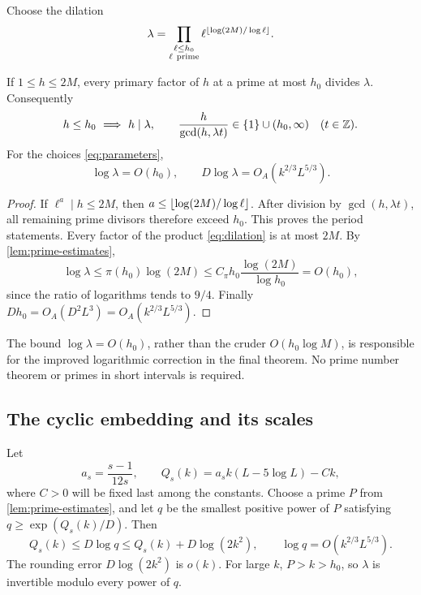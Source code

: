Choose the dilation
\begin{equation}\label{eq:dilation}
 \lambda=
 \prod_{\substack{\ell\le h_0\\\ell\ {\rm prime}}}
 \ell^{\left\lfloor \log(2M)/\log\ell\right\rfloor} .
\end{equation}

\begin{lemma}\label{lem:dilation}
If \(1\le h\le2M\), every primary factor of \(h\) at a prime at most
\(h_0\) divides \(\lambda\). Consequently
\[
 h\le h_0\ \Longrightarrow\ h\mid\lambda,\qquad
 \frac{h}{\gcd(h,\lambda t)}\in\{1\}\cup(h_0,\infty)
 \quad(t\in\Z).
\]
For the choices \eqref{eq:parameters},
\begin{equation}\label{eq:dilation-cost}
 \log\lambda=O(h_0),\qquad
 D\log\lambda=O_A(k^{2/3}L^{5/3}).
\end{equation}
\end{lemma}

\begin{proof}
If \(\ell^a\mid h\le2M\), then
\(a\le\left\lfloor \log(2M)/\log\ell\right\rfloor\).
After division by \(\gcd(h,\lambda t)\), all remaining prime
divisors therefore exceed \(h_0\). This proves the period statements.
Every factor of the product \eqref{eq:dilation} is at most \(2M\).
By \cref{lem:prime-estimates},
\[
 \log\lambda\le\pi(h_0)\log(2M)
 \le C_\pi h_0\frac{\log(2M)}{\log h_0}=O(h_0),
\]
since the ratio of logarithms tends to \(9/4\).
Finally \(D h_0=O_A(D^2L^3)=O_A(k^{2/3}L^{5/3})\).
\end{proof}

The bound \(\log\lambda=O(h_0)\), rather than the cruder
\(O(h_0\log M)\), is responsible for the improved logarithmic correction
in the final theorem. No prime number theorem or primes in short
intervals is required.

\subsection{The cyclic embedding and its scales}

Let
\begin{equation}\label{eq:target}
 a_s=\frac{s-1}{12s},\qquad
 Q_s(k)=a_s k(L-5\log L)-Ck,
\end{equation}
where \(C>0\) will be fixed last among the constants.
Choose a prime \(P\) from \cref{lem:prime-estimates}, and let \(q\)
be the smallest positive power of \(P\) satisfying
\(q\ge\exp(Q_s(k)/D)\). Then
\begin{equation}\label{eq:q-rounding}
 Q_s(k)\le D\log q\le Q_s(k)+D\log(2k^2),
 \qquad
 \log q=O(k^{2/3}L^{5/3}).
\end{equation}
The rounding error \(D\log(2k^2)\) is \(o(k)\).
For large \(k\), \(P>k>h_0\), so \(\lambda\) is invertible modulo
every power of \(q\).

